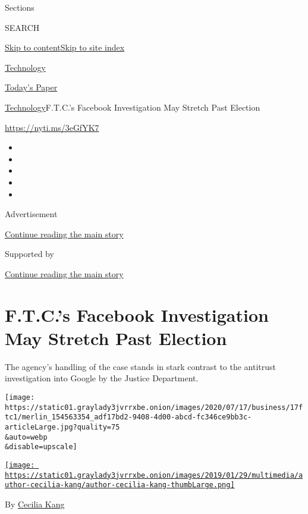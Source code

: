 Sections

SEARCH

\protect\hyperlink{site-content}{Skip to
content}\protect\hyperlink{site-index}{Skip to site index}

\href{https://www.nytimes3xbfgragh.onion/section/technology}{Technology}

\href{https://myaccount.nytimes3xbfgragh.onion/auth/login?response_type=cookie\&client_id=vi}{}

\href{https://www.nytimes3xbfgragh.onion/section/todayspaper}{Today's
Paper}

\href{/section/technology}{Technology}\textbar{}F.T.C.'s Facebook
Investigation May Stretch Past Election

\url{https://nyti.ms/3eGfYK7}

\begin{itemize}
\item
\item
\item
\item
\item
\end{itemize}

Advertisement

\protect\hyperlink{after-top}{Continue reading the main story}

Supported by

\protect\hyperlink{after-sponsor}{Continue reading the main story}

\hypertarget{ftcs-facebook-investigation-may-stretch-past-election}{%
\section{F.T.C.'s Facebook Investigation May Stretch Past
Election}\label{ftcs-facebook-investigation-may-stretch-past-election}}

The agency's handling of the case stands in stark contrast to the
antitrust investigation into Google by the Justice Department.

\texttt{[image: https://static01.graylady3jvrrxbe.onion/images/2020/07/17/business/17ftc1/merlin\_154563354\_adf17bd2-9408-4d00-abcd-fc346ce9bb3c-articleLarge.jpg?quality=75\\\&auto=webp\\\&disable=upscale]}

\href{https://www.nytimes3xbfgragh.onion/by/cecilia-kang}{\texttt{[image: https://static01.graylady3jvrrxbe.onion/images/2019/01/29/multimedia/author-cecilia-kang/author-cecilia-kang-thumbLarge.png]}}

By \href{https://www.nytimes3xbfgragh.onion/by/cecilia-kang}{Cecilia
Kang}


